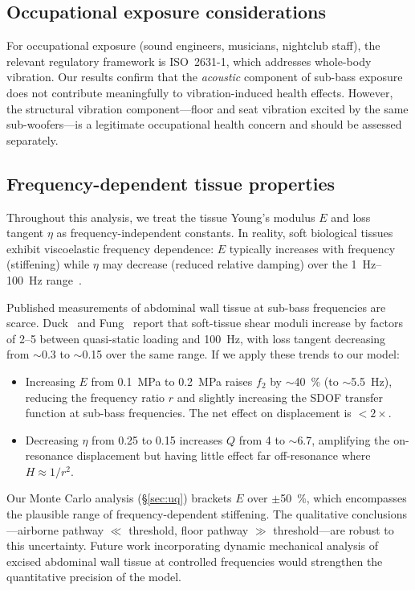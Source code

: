 \subsection{Occupational exposure considerations}
\label{sec:occupational}

For occupational exposure (sound engineers, musicians, nightclub staff),
the relevant regulatory framework is ISO~2631-1, which addresses
whole-body vibration.  Our results confirm that the \emph{acoustic}
component of sub-bass exposure does not contribute meaningfully to
vibration-induced health effects.  However, the structural vibration
component---floor and seat vibration excited by the same
sub-woofers---is a legitimate occupational health concern and should be
assessed separately.

\subsection{Frequency-dependent tissue properties}
\label{sec:freq-dependent}

Throughout this analysis, we treat the tissue Young's modulus $E$ and
loss tangent $\eta$ as frequency-independent constants.  In reality,
soft biological tissues exhibit viscoelastic frequency dependence: $E$
typically increases with frequency (stiffening) while $\eta$ may
decrease (reduced relative damping) over the \SIrange{1}{100}{\hertz}
range~\cite{Griffin1990, Mansfield2005}.

Published measurements of abdominal wall tissue at sub-bass frequencies
are scarce.  Duck~\cite{Duck1990} and Fung~\cite{Fung1993} report that soft-tissue shear
moduli increase by factors of 2--5 between quasi-static loading and
\SI{100}{\hertz}, with loss tangent decreasing from $\sim$0.3 to
$\sim$0.15 over the same range.  If we apply these trends to our model:
%
\begin{itemize}
  \item Increasing $E$ from \SI{0.1}{\mega\pascal} to
    \SI{0.2}{\mega\pascal} raises $f_2$ by $\sim$\SI{40}{\percent}
    (to $\sim$\SI{5.5}{\hertz}), reducing the frequency ratio $r$ and
    slightly increasing the SDOF transfer function at sub-bass
    frequencies.  The net effect on displacement is $< 2\times$.

  \item Decreasing $\eta$ from 0.25 to 0.15 increases $Q$ from 4 to
    $\sim$6.7, amplifying the on-resonance displacement but having
    little effect far off-resonance where $H \approx 1/r^2$.
\end{itemize}
%
Our Monte Carlo analysis (\S\ref{sec:uq}) brackets $E$ over
$\pm$\SI{50}{\percent}, which encompasses the plausible range of
frequency-dependent stiffening.  The qualitative conclusions---airborne
pathway $\ll$ threshold, floor pathway $\gg$ threshold---are robust to
this uncertainty.  Future work incorporating dynamic mechanical analysis
of excised abdominal wall tissue at controlled frequencies would
strengthen the quantitative precision of the model.

